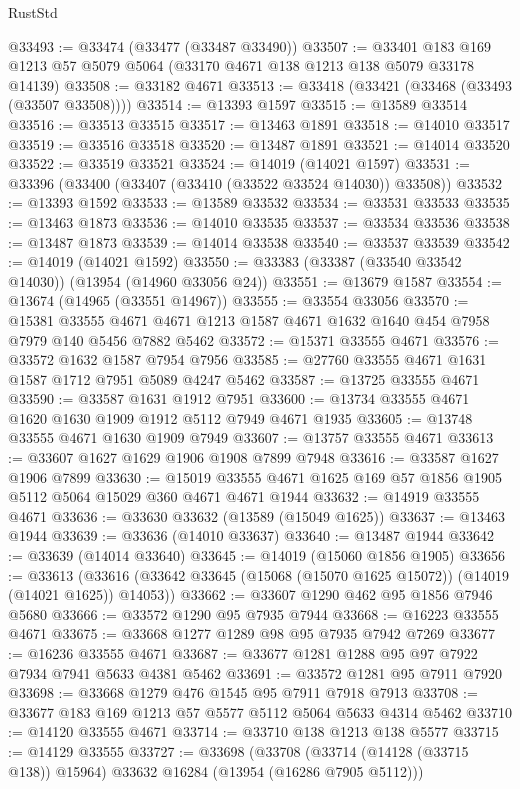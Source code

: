 \begin{lexlean}{RustStd}
\begin{coremodule}
@33493 := @33474 (@33477 (@33487 @33490))
@33507 := @33401 @183 @169 @1213 @57 @5079 @5064 (@33170 @4671 @138 @1213 @138 @5079 @33178 @14139)
@33508 := @33182 @4671
@33513 := @33418 (@33421 (@33468 (@33493 (@33507 @33508))))
@33514 := @13393 @1597
@33515 := @13589 @33514
@33516 := @33513 @33515
@33517 := @13463 @1891
@33518 := @14010 @33517
@33519 := @33516 @33518
@33520 := @13487 @1891
@33521 := @14014 @33520
@33522 := @33519 @33521
@33524 := @14019 (@14021 @1597)
@33531 := @33396 (@33400 (@33407 (@33410 (@33522 @33524 @14030)) @33508))
@33532 := @13393 @1592
@33533 := @13589 @33532
@33534 := @33531 @33533
@33535 := @13463 @1873
@33536 := @14010 @33535
@33537 := @33534 @33536
@33538 := @13487 @1873
@33539 := @14014 @33538
@33540 := @33537 @33539
@33542 := @14019 (@14021 @1592)
@33550 := @33383 (@33387 (@33540 @33542 @14030)) (@13954 (@14960 @33056 @24))
@33551 := @13679 @1587
@33554 := @13674 (@14965 (@33551 @14967))
@33555 := @33554 @33056
@33570 := @15381
    @33555
    @4671
    @4671
    @1213
    @1587
    @4671
    @1632
    @1640
    @454
    @7958
    @7979
    @140
    @5456
    @7882
    @5462
@33572 := @15371 @33555 @4671
@33576 := @33572 @1632 @1587 @7954 @7956
@33585 := @27760 @33555 @4671 @1631 @1587 @1712 @7951 @5089 @4247 @5462
@33587 := @13725 @33555 @4671
@33590 := @33587 @1631 @1912 @7951
@33600 := @13734 @33555 @4671 @1620 @1630 @1909 @1912 @5112 @7949 @4671 @1935
@33605 := @13748 @33555 @4671 @1630 @1909 @7949
@33607 := @13757 @33555 @4671
@33613 := @33607 @1627 @1629 @1906 @1908 @7899 @7948
@33616 := @33587 @1627 @1906 @7899
@33630 := @15019 @33555 @4671 @1625 @169 @57 @1856 @1905 @5112 @5064 @15029 @360 @4671 @4671 @1944
@33632 := @14919 @33555 @4671
@33636 := @33630 @33632 (@13589 (@15049 @1625))
@33637 := @13463 @1944
@33639 := @33636 (@14010 @33637)
@33640 := @13487 @1944
@33642 := @33639 (@14014 @33640)
@33645 := @14019 (@15060 @1856 @1905)
@33656 := @33613
    (@33616 (@33642 @33645 (@15068 (@15070 @1625 @15072)) (@14019 (@14021 @1625)) @14053))
@33662 := @33607 @1290 @462 @95 @1856 @7946 @5680
@33666 := @33572 @1290 @95 @7935 @7944
@33668 := @16223 @33555 @4671
@33675 := @33668 @1277 @1289 @98 @95 @7935 @7942 @7269
@33677 := @16236 @33555 @4671
@33687 := @33677 @1281 @1288 @95 @97 @7922 @7934 @7941 @5633 @4381 @5462
@33691 := @33572 @1281 @95 @7911 @7920
@33698 := @33668 @1279 @476 @1545 @95 @7911 @7918 @7913
@33708 := @33677 @183 @169 @1213 @57 @5577 @5112 @5064 @5633 @4314 @5462
@33710 := @14120 @33555 @4671
@33714 := @33710 @138 @1213 @138 @5577
@33715 := @14129 @33555
@33727 := @33698
    (@33708 (@33714 (@14128 (@33715 @138)) @15964) @33632 @16284 (@13954 (@16286 @7905 @5112)))

\end{coremodule}
\end{lexlean}
